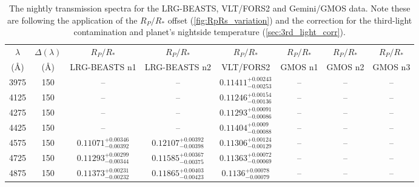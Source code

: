 \documentclass[twocolumn]{aastex63}
\begin{document}
\begin{table*}[ht!]
\caption{The nightly transmission spectra for the LRG-BEASTS, VLT/FORS2 and Gemini/GMOS data. Note these are following the application of the $R_P/R_*$ offset (\autoref{fig:RpRs_variation}) and the correction for the third-light contamination and planet's nightside temperature (\autoref{sec:3rd_light_corr}).}
\label{tab:ts_LRG-BEASTS}
\centering
\begin{tabular}{cccccccc} \hline
$\lambda$ &     $\Delta(\lambda)$     & $R_P/R_*$ & $R_P/R_*$ & $R_P/R_*$ & $R_P/R_*$ & $R_P/R_*$  & $R_P/R_*$ \\ 
(\AA) & (\AA) & LRG-BEASTS n1 & LRG-BEASTS n2 & VLT/FORS2 & GMOS n1 & GMOS n2 & GMOS n3 \\ \hline
3975     &      150 &                              -- &                              -- &  $0.11411^{+0.00243}_{-0.00253}$ &                              -- &                              -- &                              -- \\
4125     &      150 &                              -- &                              -- &  $0.11246^{+0.00154}_{-0.00136}$ &                              -- &                              -- &                              -- \\
4275     &      150 &                              -- &                              -- &  $0.11293^{+0.00091}_{-0.00086}$ &                              -- &                              -- &                              -- \\
4425     &      150 &                              -- &                              -- &   $0.11404^{+0.0009}_{-0.00088}$ &                              -- &                              -- &                              -- \\
4575     &      150 &  $0.11071^{+0.00346}_{-0.00392}$ &  $0.12107^{+0.00392}_{-0.00398}$ &  $0.11306^{+0.00124}_{-0.00129}$ &                              -- &                              -- &                              -- \\
4725     &      150 &  $0.11293^{+0.00299}_{-0.00344}$ &  $0.11585^{+0.00367}_{-0.00375}$ &  $0.11363^{+0.00072}_{-0.00069}$ &                              -- &                              -- &                              -- \\
4875     &      150 &  $0.11373^{+0.00231}_{-0.00232}$ &  $0.11865^{+0.00403}_{-0.00423}$ &   $0.1136^{+0.00078}_{-0.00079}$ &                              -- &                              -- &                              -- \\

\end{tabular}
\end{table*}
\end{document}
